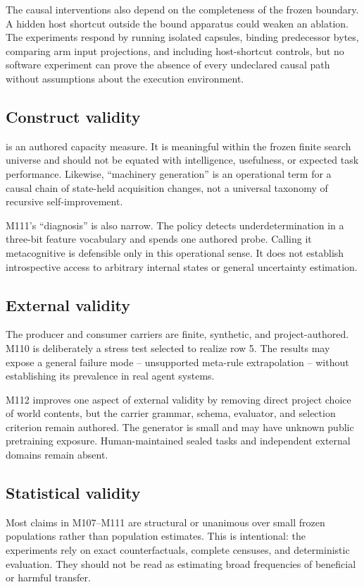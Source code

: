 The causal interventions also depend on the completeness of the frozen boundary. A hidden host shortcut outside the bound apparatus could weaken an ablation. The experiments respond by running isolated capsules, binding predecessor bytes, comparing arm input projections, and including host-shortcut controls, but no software experiment can prove the absence of every undeclared causal path without assumptions about the execution environment.

\subsection{Construct validity}
\reach is an authored capacity measure. It is meaningful within the frozen finite search universe and should not be equated with intelligence, usefulness, or expected task performance. Likewise, ``machinery generation'' is an operational term for a causal chain of state-held acquisition changes, not a universal taxonomy of recursive self-improvement.

M111's ``diagnosis'' is also narrow. The policy detects underdetermination in a three-bit feature vocabulary and spends one authored probe. Calling it metacognitive is defensible only in this operational sense. It does not establish introspective access to arbitrary internal states or general uncertainty estimation.

\subsection{External validity}
The producer and consumer carriers are finite, synthetic, and project-authored. M110 is deliberately a stress test selected to realize row 5. The results may expose a general failure mode -- unsupported meta-rule extrapolation -- without establishing its prevalence in real agent systems.

M112 improves one aspect of external validity by removing direct project choice of world contents, but the carrier grammar, schema, evaluator, and selection criterion remain authored. The generator is small and may have unknown public pretraining exposure. Human-maintained sealed tasks and independent external domains remain absent.

\subsection{Statistical validity}
Most claims in M107--M111 are structural or unanimous over small frozen populations rather than population estimates. This is intentional: the experiments rely on exact counterfactuals, complete censuses, and deterministic evaluation. They should not be read as estimating broad frequencies of beneficial or harmful transfer.

